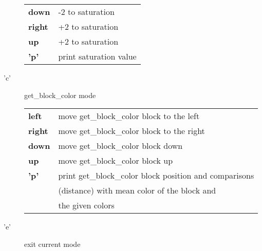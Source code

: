 \begin{description}
\begin{tabular}{ll}
                {\bf down } & -2 to saturation \\
                {\bf right} & +2 to saturation \\
                {\bf up   } & +2 to saturation \\
                {\bf 'p'  } & print saturation value \\
            \end{tabular}
        \item['c'] get\_block\_color mode \\
            \begin{tabular}{ll} 
                {\bf left } & move get\_block\_color block to the left  \\
                {\bf right} & move get\_block\_color block to the right \\
                {\bf down } & move get\_block\_color block down \\
                {\bf up   } & move get\_block\_color block up \\
                {\bf 'p'  } & print get\_block\_color block position and 
                              comparisons \\
                            & (distance) with mean color of 
                              the block and \\
                            & the given colors
            \end{tabular}
        \item['e'] exit current mode
    \end{description}
